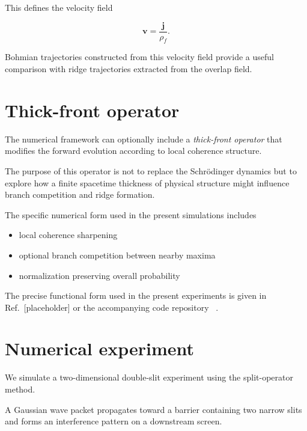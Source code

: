 \documentclass[aps,prl,reprint]{revtex4-2}
\begin{document}
This defines the velocity field

\begin{equation}
\mathbf v = \frac{\mathbf j}{\rho_f}.
\end{equation}

Bohmian trajectories constructed from this velocity field
provide a useful comparison with ridge trajectories extracted
from the overlap field.



\section{Thick-front operator}

The numerical framework can optionally include a
\textit{thick-front operator} that modifies the forward evolution
according to local coherence structure.

The purpose of this operator is not to replace the Schr\"odinger
dynamics but to explore how a finite spacetime thickness of
physical structure might influence branch competition and
ridge formation.

The specific numerical form used in the present simulations
includes

\begin{itemize}

\item local coherence sharpening

\item optional branch competition between nearby maxima

\item normalization preserving overall probability

\end{itemize}

The precise functional form used in the present experiments is
given in Ref.~[placeholder] or the accompanying code repository
~\cite{quantumtoy}.



\section{Numerical experiment}

We simulate a two-dimensional double-slit experiment using the
split-operator method.

A Gaussian wave packet propagates toward a barrier containing
two narrow slits and forms an interference pattern on a
downstream screen.
\end{document}
